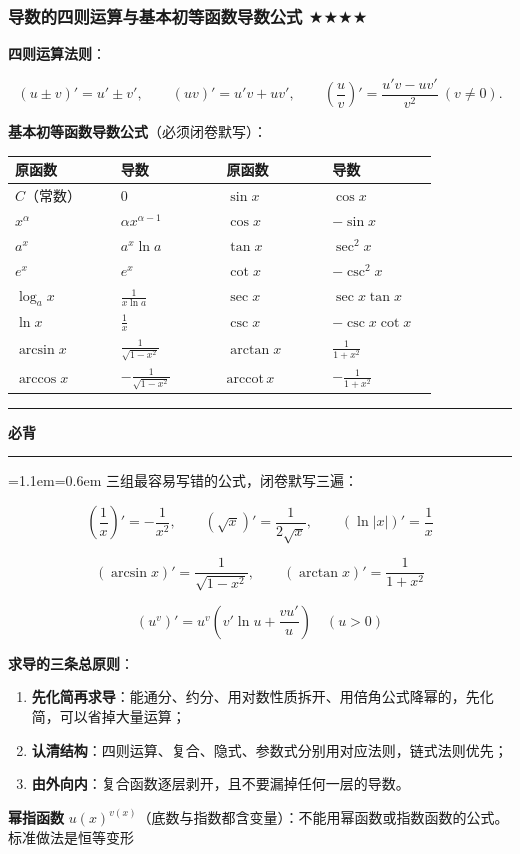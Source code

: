 \documentclass[11pt,openany,UTF8]{ctexbook}
\newcommand{\callouthead}[2]{%
  \par\addvspace{7pt}\noindent
  {\color{#1}\rule[-0.15em]{3pt}{1.05em}}\hspace{0.5em}%
  {\bfseries\color{#1}#2}\par\nobreak\vspace{-0.35em}%
  {\color{rulesep}\hrule height 0.4pt}\nobreak\vspace{0.45em}%
  \begingroup\small\setlength{\parindent}{0pt}%
  \leftskip=1.1em\rightskip=0.6em\noindent\ignorespaces}
\newcommand{\calloutend}{\par\endgroup\addvspace{7pt}}
\newenvironment{callkey}[1]{\callouthead{keybar}{#1}}{\calloutend}
\begin{document}
\subsubsection{导数的四则运算与基本初等函数导数公式 $\bigstar$$\bigstar$$\bigstar$$\bigstar$}

\textbf{四则运算法则}：

\[(u\pm v)'=u'\pm v',\qquad (uv)'=u'v+uv',\qquad \left(\frac uv\right)'=\frac{u'v-uv'}{v^2}\ (v\ne0).\]

\textbf{基本初等函数导数公式}（必须闭卷默写）：

\begingroup\small\setlength{\tabcolsep}{4.0pt}
\begin{longtable}{@{}L{0.2278\linewidth}L{0.2278\linewidth}L{0.2278\linewidth}L{0.2278\linewidth}@{}}
\toprule
\textbf{原函数} & \textbf{导数} & \textbf{原函数} & \textbf{导数} \\
\midrule
\endhead
$C$（常数） & $0$ & $\sin x$ & $\cos x$ \\
$x^\alpha$ & $\alpha x^{\alpha-1}$ & $\cos x$ & $-\sin x$ \\
$a^x$ & $a^x\ln a$ & $\tan x$ & $\sec^2x$ \\
$e^x$ & $e^x$ & $\cot x$ & $-\csc^2x$ \\
$\log_ax$ & $\frac{1}{x\ln a}$ & $\sec x$ & $\sec x\tan x$ \\
$\ln x$ & $\frac1x$ & $\csc x$ & $-\csc x\cot x$ \\
$\arcsin x$ & $\frac{1}{\sqrt{1-x^2}}$ & $\arctan x$ & $\frac{1}{1+x^2}$ \\
$\arccos x$ & $-\frac{1}{\sqrt{1-x^2}}$ & $\mathrm{arccot}\,x$ & $-\frac{1}{1+x^2}$ \\
\bottomrule
\end{longtable}
\endgroup

\begin{callkey}{必背}
三组最容易写错的公式，闭卷默写三遍：

\[\left(\frac{1}{x}\right)'=-\frac{1}{x^2},\qquad (\sqrt{x})'=\frac{1}{2\sqrt{x}},\qquad (\ln|x|)'=\frac{1}{x}\]

\[(\arcsin x)'=\frac{1}{\sqrt{1-x^2}},\qquad (\arctan x)'=\frac{1}{1+x^2}\]

\[(u^v)'=u^v\left(v'\ln u+\frac{vu'}{u}\right)\quad(u>0)\]

\end{callkey}

\textbf{求导的三条总原则}：

\begin{enumerate}
\item \textbf{先化简再求导}：能通分、约分、用对数性质拆开、用倍角公式降幂的，先化简，可以省掉大量运算；
\item \textbf{认清结构}：四则运算、复合、隐式、参数式分别用对应法则，链式法则优先；
\item \textbf{由外向内}：复合函数逐层剥开，且不要漏掉任何一层的导数。
\end{enumerate}
\textbf{幂指函数} $u(x)^{v(x)}$（底数与指数都含变量）：不能用幂函数或指数函数的公式。标准做法是恒等变形
\end{document}
